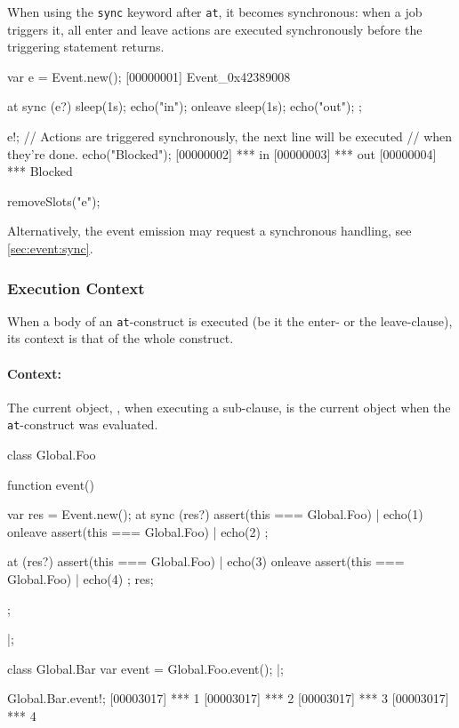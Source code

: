When using the \lstinline{sync} keyword after \lstinline{at}, it becomes
synchronous: when a job triggers it, all enter and leave actions are
executed synchronously before the triggering statement returns.

\begin{urbiscript}[firstnumber=1]
var e = Event.new();
[00000001] Event_0x42389008

at sync (e?)
{
  sleep(1s);
  echo("in");
}
onleave
{
  sleep(1s);
  echo("out");
};

e!;
// Actions are triggered synchronously, the next line will be executed
// when they're done.
echo("Blocked");
[00000002] *** in
[00000003] *** out
[00000004] *** Blocked
\end{urbiscript}
\begin{urbicomment}
removeSlots("e");
\end{urbicomment}

Alternatively, the event emission may request a synchronous handling, see
\autoref{sec:event:sync}.

\subsubsection{Execution Context}
When a body of an \lstinline{at}-construct is executed (be it the enter- or
the leave-clause), its context is that of the whole construct.

\paragraph{Context: \this}
The current object, \this, when executing a sub-clause, is the current
object when the \lstinline{at}-construct was evaluated.

\begin{urbiscript}
class Global.Foo
{
  function event()
  {
    var res = Event.new();
    at sync (res?) { assert(this === Global.Foo) | echo(1) }
    onleave        { assert(this === Global.Foo) | echo(2) };

    at (res?)      { assert(this === Global.Foo) | echo(3) }
    onleave        { assert(this === Global.Foo) | echo(4) };
    res;
  };
}|;

class Global.Bar
{
  var event = Global.Foo.event();
}|;

Global.Bar.event!;
[00003017] *** 1
[00003017] *** 2
[00003017] *** 3
[00003017] *** 4
\end{urbiscript}

